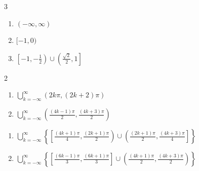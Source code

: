 \documentclass{ximera}
\begin{document}
\begin{multicols}{3}

\begin{enumerate}

\setcounter{enumi}{\value{HW}}


\item $(-\infty, \infty)$
\item $[-1,0)$ 
\item $\left[-1, -\frac{1}{2}\right) \cup \left( \frac{\sqrt{2}}{2}, 1\right]$

\setcounter{HW}{\value{enumi}}

\end{enumerate}

\end{multicols}

\begin{multicols}{2}

\begin{enumerate}

\setcounter{enumi}{\value{HW}}

\item $\displaystyle \bigcup_{k=-\infty}^{\infty} \left( 2k\pi, (2k+2)\pi \right)$
\item $\displaystyle \bigcup_{k=-\infty}^{\infty} \left( \frac{(4k - 1)\pi}{2}, \frac{(4k + 3)\pi}{2} \right)$

\setcounter{HW}{\value{enumi}}

\end{enumerate}

\end{multicols}

\begin{enumerate}

\setcounter{enumi}{\value{HW}}

\item $\displaystyle \bigcup_{k=-\infty}^{\infty} \left\{ \left[ \frac{(4k + 1)\pi}{4}, \frac{(2k + 1)\pi}{2} \right) \cup \left( \frac{(2k + 1)\pi}{2}, \frac{(4k + 3)\pi}{4} \right] \right\}$

\item $\displaystyle \bigcup_{k=-\infty}^{\infty} \left\{ \left[ \frac{(6k - 1)\pi}{3}, \frac{(6k + 1)\pi}{3} \right] \cup \left( \frac{(4k + 1)\pi}{2}, \frac{(4k + 3)\pi}{2} \right) \right\}$

\setcounter{HW}{\value{enumi}}

\end{enumerate}
\end{document}
